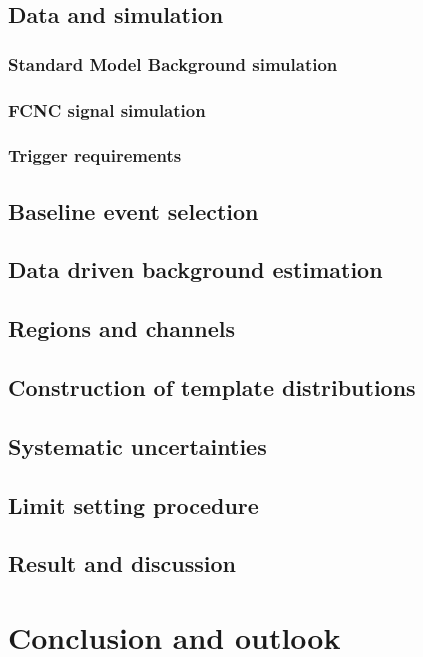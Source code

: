 \section[Samples]{Data and simulation}
\subsection{Standard Model Background simulation}
\subsection{FCNC signal simulation}
\subsection{Trigger requirements}
\section{Baseline event selection}
\section{Data driven background estimation}
\section{Regions and channels}
\section{Construction of template distributions}
\section{Systematic uncertainties}
\section{Limit setting procedure}
\section{Result and discussion}
\chapter{Conclusion and outlook}
\label{s:showcase}
%



\backmatter

\hypersetup{urlcolor=darkgreen}
\printbibliography  %
\hypersetup{urlcolor=darkblue}

\printglossaries  %



